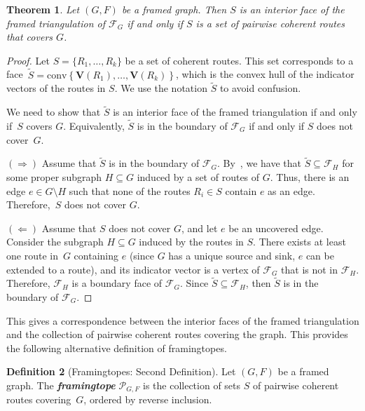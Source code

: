 \documentclass[12pt, reqno]{amsart}
\newcommand{\defn}[1]{{\color{blue!50!black}\textbf{\emph{#1}}}}
\newcommand{\set}[1]{\left\lbrace#1\right\rbrace}
\theoremstyle{plain}
\newtheorem{theorem}{Theorem}[section]
\theoremstyle{definition}
\newtheorem{definition}[theorem]{Definition}
\numberwithin{equation}{section}
\begin{document}
\begin{theorem}\label{thm_interior_equal_covering}    
    Let $(G,F)$ be a framed graph. Then $S$ is an interior face of the framed triangulation of $\mathcal{F}_G$ if and only if $S$ is a set of pairwise coherent routes that covers $G$.
\end{theorem}


\begin{proof}
Let $S= \{R_1,\ldots, R_k\}$ be a set of coherent routes. This set corresponds to a face~$\widetilde{S}=\text{conv}\set{\textbf{V}(R_1),\ldots,\textbf{V}(R_k)}$, which is the convex hull of the indicator vectors of the routes in $S$. We use the notation $\widetilde{S}$ to avoid confusion.

We need to show that $\widetilde{S}$ is an interior face of the framed triangulation if and only if~$S$ covers $G$. Equivalently, $\widetilde{S}$ is in the boundary of $\mathcal{F}_G$ if and only if $S$ does not cover~$G$.

$(\Rightarrow)$ Assume that $\widetilde{S}$ is in the boundary of $\mathcal{F}_G$. By~, we have that $\widetilde{S}\subseteq \mathcal{F}_H$ for some proper subgraph $H\subseteq G$ induced by a set of routes of $G$. Thus, there is an edge $e\in G\setminus H$ such that none of the routes $R_i\in S$ contain $e$ as an edge. Therefore,~$S$ does not cover $G$.

$(\Leftarrow)$ Assume that $S$ does not cover $G$, and let $e$ be an uncovered edge. Consider the subgraph $H\subseteq G$ induced by the routes in $S$. There exists at least one route in~$G$ containing $e$ (since $G$ has a unique source and sink, $e$ can be extended to a route), and its indicator vector is a vertex of $\mathcal{F}_G$ that is not in $\mathcal{F}_H$. Therefore, $\mathcal{F}_H$ is a boundary face of $\mathcal{F}_G$. Since $\widetilde{S}\subseteq \mathcal{F}_H$, then $\widetilde{S}$ is in the boundary of $\mathcal{F}_G$.
\end{proof}

This gives a correspondence between the interior faces of the framed triangulation and the collection of pairwise coherent routes covering the graph. This provides the following alternative definition of framingtopes.

\begin{definition}[Framingtopes: Second Definition]\label{def_framingtope_coveringRoutes}
    Let $(G,F)$ be a framed graph. The \defn{framingtope} $\mathscr{P}_{G,F}$ is the collection of sets $S$ of pairwise coherent routes covering~$G$, ordered by reverse inclusion.
\end{definition}
\end{document}
